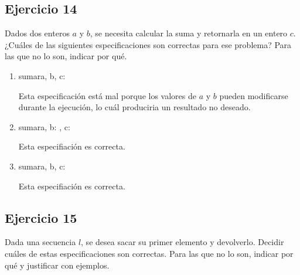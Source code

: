 \subsection{Ejercicio 14}
Dados dos enteros $a$ y $b$, se necesita calcular la suma y retornarla en un entero $c$. ¿Cuáles de las siguientes especificaciones son correctas para ese problema? Para las que no lo son, indicar por qué.

\begin{enumerate}[label=\alph*)]
      \item \begin{proc}{sumar}{\Inout a, b, c: \ent}{}
            \end{proc}

            Esta especificación está mal porque los valores de $a$ y $b$ pueden modificarse durante la ejecución, lo cuál produciria un resultado no deseado.

      \item \begin{proc}{sumar}{\In a, b: \ent, \Inout c: \ent}{}
            \end{proc}

            Esta especifiación es correcta.

      \item \begin{proc}{sumar}{\Inout a, b, c: \ent}{}
            \end{proc}

            Esta especifiación es correcta.
\end{enumerate}

\subsection{Ejercicio 15}
Dada una secuencia $l$, se desea sacar su primer elemento y devolverlo. Decidir cuáles de estas especificaciones son correctas. Para las que no lo son, indicar por qué y justificar con ejemplos.

